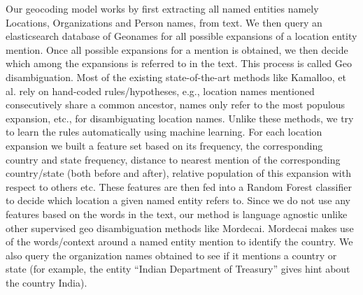 Our geocoding model works by first extracting all named entities namely Locations, Organizations and Person names, from text. We then query an elasticsearch database of Geonames for all possible expansions of a location entity mention. Once all possible expansions for a mention is obtained, we then decide which among the expansions is referred to in the text. This process is called Geo disambiguation. Most of the existing state-of-the-art methods like Kamalloo, et al. rely on hand-coded rules/hypotheses, e.g., location names mentioned consecutively share a common ancestor, names only refer to the most populous expansion, etc., for disambiguating location names.  Unlike these methods, we try to learn the rules automatically using machine learning. For each location expansion we built a feature set based on its frequency, the corresponding country and state frequency, distance to nearest mention of the corresponding country/state (both before and after), relative population of this expansion with respect to others etc. These features are then fed into a Random Forest classifier to decide which location a given named entity refers to. Since we do not use any features based on the words in the text, our method is language agnostic unlike other supervised geo disambiguation methods like Mordecai. Mordecai makes use of the words/context around a named entity mention to identify the country. We also query the organization names obtained to see if it mentions a country or state (for example, the entity “Indian Department of Treasury” gives hint about the country India). 
